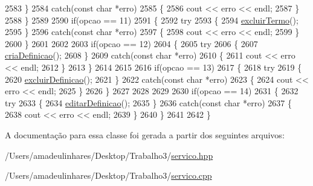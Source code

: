\begin{DoxyCode}
2583     \}
2584     \textcolor{keywordflow}{catch}(\textcolor{keyword}{const} \textcolor{keywordtype}{char} *erro)
2585     \{
2586       cout << erro << endl;
2587     \}
2588   \}
2589 
2590   \textcolor{keywordflow}{if}(opcao == 11)
2591   \{
2592     \textcolor{keywordflow}{try}
2593     \{
2594       \mbox{\hyperlink{class_servico_usuarios_desenvolvedor_a20712917886eaf28a2a9b308d14d7b04}{excluirTermo}}();
2595     \}
2596     \textcolor{keywordflow}{catch}(\textcolor{keyword}{const} \textcolor{keywordtype}{char} *erro)
2597     \{
2598       cout << erro << endl;
2599     \}
2600   \}
2601 
2602 
2603   \textcolor{keywordflow}{if}(opcao == 12)
2604   \{
2605     \textcolor{keywordflow}{try}
2606     \{
2607       \mbox{\hyperlink{class_servico_usuarios_desenvolvedor_a851c2a4b054df2a14f66c451f4656d52}{criaDefinicao}}();
2608     \}
2609     \textcolor{keywordflow}{catch}(\textcolor{keyword}{const} \textcolor{keywordtype}{char} *erro)
2610     \{
2611       cout << erro << endl;
2612     \}
2613   \}
2614 
2615 
2616   \textcolor{keywordflow}{if}(opcao == 13)
2617   \{
2618     \textcolor{keywordflow}{try}
2619     \{
2620       \mbox{\hyperlink{class_servico_usuarios_desenvolvedor_a422f9a3ee77a0d560858c9f7c266b9ee}{excluirDefinicao}}();
2621     \}
2622     \textcolor{keywordflow}{catch}(\textcolor{keyword}{const} \textcolor{keywordtype}{char} *erro)
2623     \{
2624       cout << erro << endl;
2625     \}
2626   \}
2627 
2628 
2629 
2630     \textcolor{keywordflow}{if}(opcao == 14)
2631     \{
2632       \textcolor{keywordflow}{try}
2633       \{
2634         \mbox{\hyperlink{class_servico_usuarios_desenvolvedor_a2a1063014d21344c6ec9a101741e5a4e}{editarDefinicao}}();
2635       \}
2636       \textcolor{keywordflow}{catch}(\textcolor{keyword}{const} \textcolor{keywordtype}{char} *erro)
2637       \{
2638         cout << erro << endl;
2639       \}
2640     \}
2641 
2642 \}
\end{DoxyCode}


A documentação para essa classe foi gerada a partir dos seguintes arquivos\+:\begin{DoxyCompactItemize}
\item 
/\+Users/amadeulinhares/\+Desktop/\+Trabalho3/\mbox{\hyperlink{servico_8hpp}{servico.\+hpp}}\item 
/\+Users/amadeulinhares/\+Desktop/\+Trabalho3/\mbox{\hyperlink{servico_8cpp}{servico.\+cpp}}\end{DoxyCompactItemize}
